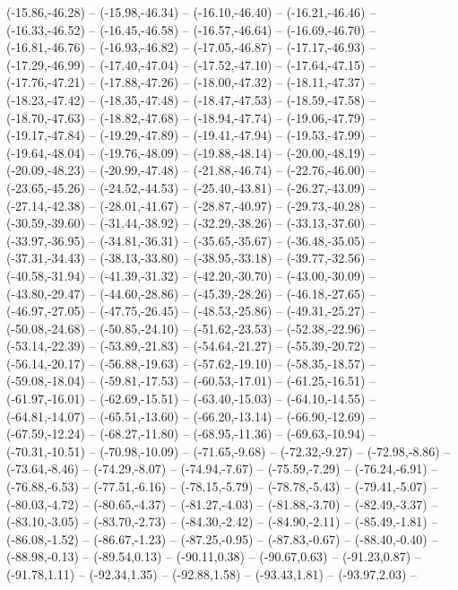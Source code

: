 {  (-15.86,-46.28) -- (-15.98,-46.34) -- (-16.10,-46.40) -- (-16.21,-46.46) -- (-16.33,-46.52) -- (-16.45,-46.58) -- (-16.57,-46.64) --
  (-16.69,-46.70) -- (-16.81,-46.76) -- (-16.93,-46.82) -- (-17.05,-46.87) -- (-17.17,-46.93) -- (-17.29,-46.99) -- (-17.40,-47.04) --
  (-17.52,-47.10) -- (-17.64,-47.15) -- (-17.76,-47.21) -- (-17.88,-47.26) -- (-18.00,-47.32) -- (-18.11,-47.37) -- (-18.23,-47.42) --
  (-18.35,-47.48) -- (-18.47,-47.53) -- (-18.59,-47.58) -- (-18.70,-47.63) -- (-18.82,-47.68) -- (-18.94,-47.74) -- (-19.06,-47.79) --
  (-19.17,-47.84) -- (-19.29,-47.89) -- (-19.41,-47.94) -- (-19.53,-47.99) -- (-19.64,-48.04) -- (-19.76,-48.09) -- (-19.88,-48.14) --
  (-20.00,-48.19) -- (-20.09,-48.23) -- (-20.99,-47.48) -- (-21.88,-46.74) -- (-22.76,-46.00) -- (-23.65,-45.26) -- (-24.52,-44.53) --
  (-25.40,-43.81) -- (-26.27,-43.09) -- (-27.14,-42.38) -- (-28.01,-41.67) -- (-28.87,-40.97) -- (-29.73,-40.28) -- (-30.59,-39.60) --
  (-31.44,-38.92) -- (-32.29,-38.26) -- (-33.13,-37.60) -- (-33.97,-36.95) -- (-34.81,-36.31) -- (-35.65,-35.67) -- (-36.48,-35.05) --
  (-37.31,-34.43) -- (-38.13,-33.80) -- (-38.95,-33.18) -- (-39.77,-32.56) -- (-40.58,-31.94) -- (-41.39,-31.32) -- (-42.20,-30.70) --
  (-43.00,-30.09) -- (-43.80,-29.47) -- (-44.60,-28.86) -- (-45.39,-28.26) -- (-46.18,-27.65) -- (-46.97,-27.05) -- (-47.75,-26.45) --
  (-48.53,-25.86) -- (-49.31,-25.27) -- (-50.08,-24.68) -- (-50.85,-24.10) -- (-51.62,-23.53) -- (-52.38,-22.96) -- (-53.14,-22.39) --
  (-53.89,-21.83) -- (-54.64,-21.27) -- (-55.39,-20.72) -- (-56.14,-20.17) -- (-56.88,-19.63) -- (-57.62,-19.10) -- (-58.35,-18.57) --
  (-59.08,-18.04) -- (-59.81,-17.53) -- (-60.53,-17.01) -- (-61.25,-16.51) -- (-61.97,-16.01) -- (-62.69,-15.51) -- (-63.40,-15.03) --
  (-64.10,-14.55) -- (-64.81,-14.07) -- (-65.51,-13.60) -- (-66.20,-13.14) -- (-66.90,-12.69) -- (-67.59,-12.24) -- (-68.27,-11.80) --
  (-68.95,-11.36) -- (-69.63,-10.94) -- (-70.31,-10.51) -- (-70.98,-10.09) -- (-71.65,-9.68) -- (-72.32,-9.27) -- (-72.98,-8.86) --
  (-73.64,-8.46) -- (-74.29,-8.07) -- (-74.94,-7.67) -- (-75.59,-7.29) -- (-76.24,-6.91) -- (-76.88,-6.53) -- (-77.51,-6.16) --
  (-78.15,-5.79) -- (-78.78,-5.43) -- (-79.41,-5.07) -- (-80.03,-4.72) -- (-80.65,-4.37) -- (-81.27,-4.03) -- (-81.88,-3.70) --
  (-82.49,-3.37) -- (-83.10,-3.05) -- (-83.70,-2.73) -- (-84.30,-2.42) -- (-84.90,-2.11) -- (-85.49,-1.81) -- (-86.08,-1.52) --
  (-86.67,-1.23) -- (-87.25,-0.95) -- (-87.83,-0.67) -- (-88.40,-0.40) -- (-88.98,-0.13) -- (-89.54,0.13) -- (-90.11,0.38) --
  (-90.67,0.63) -- (-91.23,0.87) -- (-91.78,1.11) -- (-92.34,1.35) -- (-92.88,1.58) -- (-93.43,1.81) -- (-93.97,2.03) --
}
